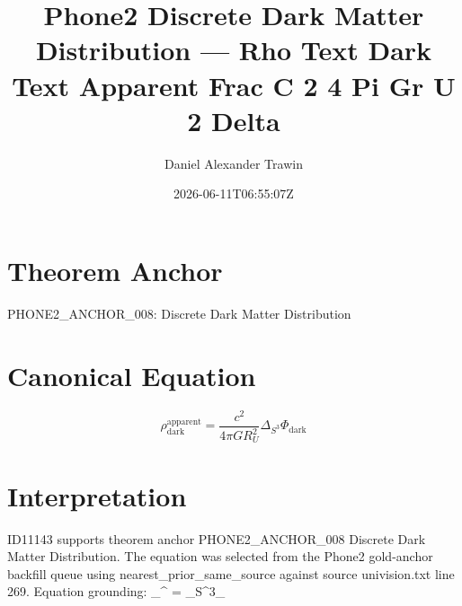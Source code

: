 \documentclass[11pt]{article}
\title{Phone2 Discrete Dark Matter Distribution — Rho Text Dark Text Apparent Frac C 2 4 Pi Gr U 2 Delta}
\author{Daniel Alexander Trawin}
\date{2026-06-11T06:55:07Z}
\begin{document}
\maketitle
\section*{Theorem Anchor}
PHONE2_ANCHOR_008: Discrete Dark Matter Distribution
\section*{Canonical Equation}
\[
\rho_{\text{dark}}^{\text{apparent}} = \frac{c^2}{4\pi GR_U^2} \Delta_{S^3}\Phi_{\text{dark}}
\]
\section*{Interpretation}
ID11143 supports theorem anchor PHONE2_ANCHOR_008 Discrete Dark Matter Distribution. The equation was selected from the Phone2 gold-anchor backfill queue using nearest_prior_same_source against source univision.txt line 269. Equation grounding: \rho_{}^{} =  \Delta_{S^3}\Phi_{}
\end{document}
